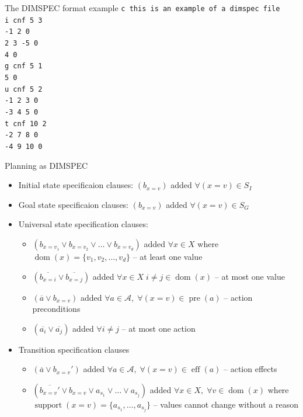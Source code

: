 \documentclass[t]{sdqbeamer}
\begin{document}
\begin{frame}{The DIMSPEC format example}
\texttt{c this is an example of a dimspec file}\\
\texttt{i cnf 5 3}\\
\texttt{-1 2 0}\\
\texttt{2 3 -5 0}\\
\texttt{4 0}\\
\texttt{g cnf 5 1}\\
\texttt{5 0}\\
\texttt{u cnf 5 2}\\
\texttt{-1 2 3 0}\\
\texttt{-3 4 5 0}\\
\texttt{t cnf 10 2}\\
\texttt{-2 7 8 0}\\
\texttt{-4 9 10 0}\\
\end{frame}

\begin{frame}{Planning as DIMSPEC}
\begin{itemize}
	\item Initial state specificaion clauses: $(b_{x=v})$ added $\forall (x=v) \in S_I$
	\item Goal state specificaion clauses: $(b_{x=v})$ added $\forall (x=v) \in S_G$
	\item Universal state specification clauses:
	\begin{itemize}
	\item $(b_{x=v_1} \vee b_{x=v_2} \vee \dots \vee b_{x=v_d})$ added
	$\forall x \in X$ where $\operatorname{dom}(x)=\{v_1, v_2, \dots, v_d\}$ -- at least one value
	\item $(\overline{b_{x=i}} \vee \overline{b_{x=j}})$ added
	$\forall x \in X\; i \neq j \in \operatorname{dom}(x)$ -- at most one value
	\item $(\overline{a} \vee b_{x=v})$ added $\forall a \in \mathcal{A},\; 
	\forall (x=v)\in \operatorname{pre}(a)$ -- action preconditions
	\item $(\overline{a_{i}} \vee \overline{a_{j}})$ added $\forall i \neq j$ -- at most one action
	\end{itemize}
	\item Transition specification clauses
	\begin{itemize}
	\item $(\overline{a} \vee b_{x=v}')$ added $\forall a \in \mathcal{A},\; 
	\forall (x=v)\in \operatorname{eff}(a)$ -- action effects
	\item $(\overline{b_{x=v}'} \vee b_{x=v} \vee a_{s_1} \vee \dots \vee a_{s_j})$ added
	$\forall x \in X,\; \forall v \in \operatorname{dom}(x)$ where
	$\operatorname{support}(x=v)=\{a_{s_1},\dots,a_{s_j}\}$ -- values cannot change without a reason
	\end{itemize}
\end{itemize}
\end{frame}
\end{document}
